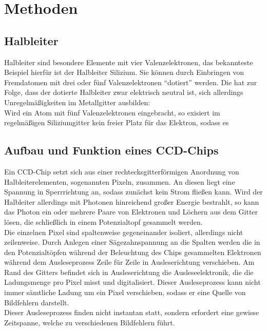 \section{Methoden}
\subsection{Halbleiter}
Halbleiter sind besondere Elemente mit vier Valenzelektronen, das bekannteste Beispiel hierfür ist der Halbleiter Silizium. Sie können durch Einbringen von Fremdatomen mit drei oder fünf Valenzelektronen \enquote{dotiert} werden. Die hat zur Folge, dass der dotierte Halbleiter zwar elektrisch neutral ist, sich allerdings Unregelmäßigkeiten im Metallgitter ausbilden: \\
Wird ein Atom mit fünf Valenzelektronen eingebracht, so exisiert im regelmäßigen Siliziumgitter kein freier Platz für das Elektron, sodass es 

\subsection{Aufbau und Funktion eines CCD-Chips}
Ein CCD-Chip setzt sich aus einer rechtecksgitterförmigen Anordnung von Halbleiterelementen, sogenannten Pixeln, zusammen. An diesen liegt eine Spannung in Sperrrichtung an, sodass zunächst kein Strom fließen kann. Wird der Halbleiter allerdings mit Photonen hinreichend großer Energie bestrahlt, so kann das Photon ein oder mehrere Paare von Elektronen und Löchern aus dem Gitter lösen, die schließlich in einem Potenzialtopf gesammelt werden. \\
Die einzelnen Pixel sind spaltenweise gegeneinander isoliert, allerdings nicht zeilenweise. Durch Anlegen einer Sägezahnspannung an die Spalten werden die in den Potenzialtöpfen während der Beleuchtung des Chips gesammelten Elektronen während dem Ausleseprozess Zeile für Zeile in Ausleserichtung verschieben. Am Rand des Gitters befindet sich in Ausleserichtung die Ausleseelektronik, die die Ladungsmenge pro Pixel misst und digitalisiert. Dieser Ausleseprozess kann nicht immer sämtliche Ladung um ein Pixel verschieben, sodass er eine Quelle von Bildfehlern darstellt. \\
Dieser Ausleseprozess finden nicht instantan statt, sondern erfordert eine gewisse Zeitspanne, welche zu verschiedenen Bildfehlern führt. 

